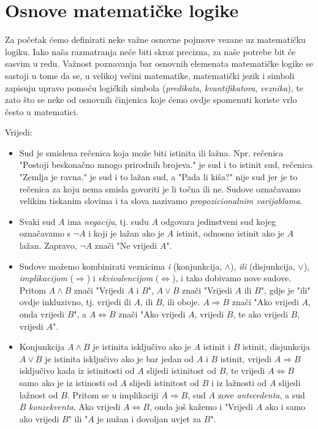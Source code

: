 \section{Osnove matematičke logike}
Za početak ćemo definirati neke važne osnovne pojmove vezane uz matematičku logiku. Iako naša razmatranja neće biti skroz precizna, za naše potrebe bit će sasvim u redu. Važnost poznavanja bar osnovnih elemenata matematičke logike se sastoji u tome da se, u velikoj većini matematike, matematički jezik i simboli zapisuju upravo pomoću logičkih simbola (\textit{predikata}, \textit{kvantifikatora}, \textit{veznika}), te zato što se neke od osnovnih činjenica koje ćemo ovdje spomenuti koriste vrlo često u matematici.

\begin{definition} Vrijedi:
\label{first}
\begin{itemize}

\item Sud je smislena rečenica koja može biti istinita ili lažna. Npr. rečenica "Postoji beskonačno mnogo prirodnih brojeva." je sud i to istinit sud, rečenica "Zemlja je ravna." je sud i to lažan sud, a "Pada li kiša?" nije sud jer je to rečenica za koju nema smisla govoriti je li točna ili ne. Sudove označavamo velikim tiskanim slovima i ta slova nazivamo \textit{propozicionalnim varijablama}.
\item Svaki sud \(A\) ima \textit{negaciju}, tj. sudu \(A\) odgovara jedinstveni sud kojeg označavamo s \(\neg A\) i koji je lažan ako je \(A\) istinit, odnosno istinit ako je \(A\) lažan. Zapravo, \(\neg A\) znači "Ne vrijedi \(A\)".
\item Sudove možemo kombinirati veznicima \textit{i} (konjunkcija, \(\wedge\)), \textit{ili} (disjunkcija, \(\vee\)), \textit{implikacijom} (\(\Rightarrow\)) i \textit{ekvivalencijom} (\(\Leftrightarrow\)), i tako dobivamo nove sudove. Pritom \(A\wedge B\) znači "Vrijedi \(A\) i \(B\)", \(A\vee B\) znači "Vrijedi \(A\) ili \(B\)", gdje je "ili" ovdje inkluzivno, tj. vrijedi ili \(A\), ili \(B\), ili oboje. \(A\Rightarrow B\) znači "Ako vrijedi \(A\), onda vrijedi \(B\)", a \(A\Leftrightarrow B\) znači "Ako vrijedi \(A\), vrijedi \(B\), te ako vrijedi \(B\), vrijedi \(A\)".
\item Konjunkcija \(A\wedge B\) je istinita isključivo ako je \(A\) istinit i \(B\) istinit, disjunkcija \(A\vee B\) je istinita isključivo ako je bar jedan od \(A\) i \(B\) istinit, vrijedi \(A\Rightarrow B\) isključivo kada iz istinitosti od \(A\) slijedi istinitost od \(B\), te vrijedi \(A\Leftrightarrow B\) samo ako je iz istinosti od \(A\) slijedi istinitost od \(B\) i iz lažnosti od \(A\) slijedi lažnost od \(B\). Pritom se u implikaciji \(A\Rightarrow B\), sud \(A\) zove \textit{antecedenta}, a sud \(B\) \textit{konzekventa}. Ako vrijedi \(A\Leftrightarrow B\), onda još kažemo i "Vrijedi \(A\) ako i samo ako vrijedi \(B\)" ili "\(A\) je nužan i dovoljan uvjet za \(B\)".
\end{itemize}
\end{definition}

